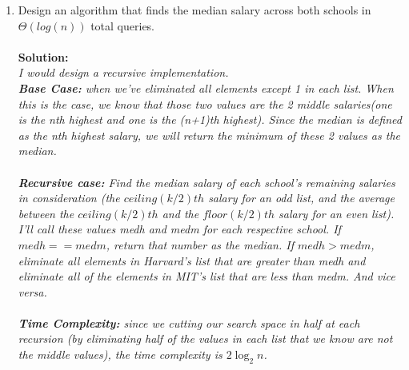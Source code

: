 \documentclass[10pt]{article}
\begin{document}
\begin{enumerate}
    \item Design an algorithm that finds the median salary across both schools in $\Theta(log(n))$ total queries. \\ \\
    \textbf{Solution:} \\ \emph{
        I would design a recursive implementation. \\
        \textbf{Base Case:} when we've eliminated all elements except 1 in each list. When this is the case, we know that those two values are the 2 middle salaries(one is the nth highest and one is the (n+1)th highest). Since the median is defined as the nth highest salary, we will return the minimum of these 2 values as the median. \\ \\
        \textbf{Recursive case:} Find the median salary of each school's remaining salaries in consideration (the $ceiling(k/2)th$ salary for an odd list, and the average between the $ceiling(k/2)th$ and the $floor(k/2)th$ salary for an even list). I'll call these values medh and medm for each respective school. If $medh == medm$, return that number as the median. If $medh > medm$, eliminate all elements in Harvard's list that are greater than medh and eliminate all of the elements in MIT's list that are less than medm. And vice versa. \\ \\
        \textbf{Time Complexity:} since we cutting our search space in half at each recursion (by eliminating half of the values in each list that we know are not the middle values), the time complexity is $2\log_2{n}$.
    }
    
    \pagebreak
    

\end{enumerate}
\end{document}

